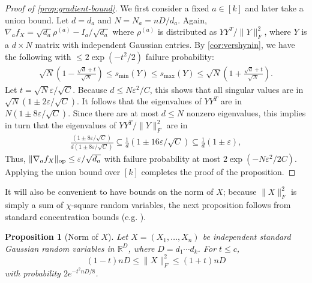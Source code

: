 \documentclass{article}
\newtheorem{prop}[theorem]{Proposition}
\DeclarePairedDelimiter{\norm}{\lVert}{\rVert}
\newcommand{\R}{{\mathbb{R}}}
\newcommand{\op}{\operatorname{op}}
\newcommand\eps{\varepsilon}
\newcommand\cN{\mathcal{N}}
\newcommand\rv{X}
\begin{document}
\begin{proof}[Proof of \cref{prop:gradient-bound}]
We first consider a fixed $a\in[k]$ and later take a union bound.
Let $d = d_a$ and $N = N_a = n D/d_a$.
Again, $\nabla_a f_{\rv} = \sqrt{d_a} \rho^{(a)} - I_a/\sqrt{d_a}$ where $\rho^{(a)}$ is distributed as $Y Y^T/\|Y\|_F^2$, where $Y$ is a $d \times N$ matrix with independent Gaussian entries.
By \cref{cor:vershynin}, we have the following with $\leq 2 \exp(-t^2/2)$ failure probability:
\begin{align*}
  \sqrt{N} \left( 1 -  \frac{\sqrt{d} + t }{\sqrt{N}}  \right)\leq s_{\min}(Y) \leq s_{\max}(Y) \leq  \sqrt{N} \left( 1 + \frac{\sqrt{d} + t }{\sqrt{N}} \right).
\end{align*}
Let $t = \sqrt{N} \eps / \sqrt{C}$.
Because $d \leq N \eps^2 / C$, this shows that all singular values are in $\sqrt{N} \left( 1 \pm 2\eps/\sqrt{C} \right)$.
It follows that the eigenvalues of $YY^T$ are in $N \left( 1 \pm 8\eps/\sqrt{C} \right)$.
Since there are at most $d \leq N$ nonzero eigenvalues, this implies in turn that the eigenvalues of $Y Y^T/\|Y\|_F^2$ are in
\begin{align*}
\frac {\left( 1 \pm 8\eps/\sqrt{C} \right)} {d \left( 1 \pm 8\eps/\sqrt{C} \right)} \subseteq \frac1d \left( 1 \pm 16\eps/\sqrt{C} \right) \subseteq \frac1d \left( 1 \pm \eps \right),
\end{align*}
Thus,
$\norm{\nabla_a f_{\rv}}_{\op} \leq \eps/\sqrt{d_a}$
with failure probability at most $2 \exp(-N \eps^2/2C)$.
Applying the union bound over $[k]$ completes the proof of the proposition.
\end{proof}

It will also be convenient to have bounds on the norm of $X$; because $\|X\|_F^2$ is simply a sum of $\chi$-square random variables, the next proposition follows from standard concentration bounds (e.g. \cite{W19}).
\begin{prop}[Norm of $X$]\label{prp:xnorm}
Let $\rv = (\rv_1,\dots,\rv_n)$ be independent standard Gaussian random variables in $\R^D$, where $D=d_1\cdots{}d_k$. For $t \leq c$,
$$ (1 - t) nD \leq \|X\|_F^2 \leq (1 + t)nD$$ with probability $2e^{-t^2 nD/8}$.
\end{prop}
\end{document}

